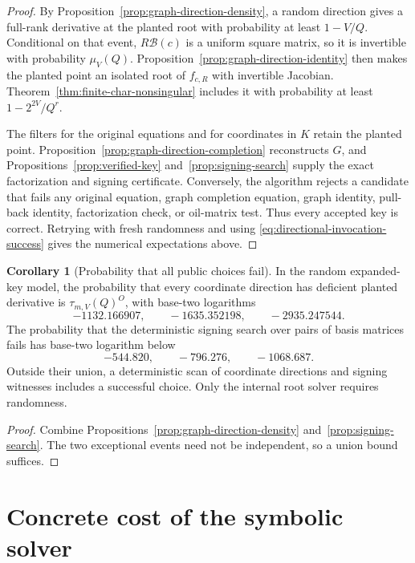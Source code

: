 \documentclass[11pt,a4paper]{article}
\theoremstyle{definition}
\newtheorem{corollary}[theorem]{Corollary}
\theoremstyle{remark}
\begin{document}
\begin{proof}
By Proposition~\ref{prop:graph-direction-density}, a random direction gives a
full-rank derivative at the planted root with probability at least $1-V/Q$.
Conditional on that event, $R\mathcal B(c)$ is a uniform square matrix, so it
is invertible with probability $\mu_V(Q)$.  Proposition~\ref{prop:graph-direction-identity}
then makes the planted point an isolated root of $f_{c,R}$ with invertible
Jacobian.  Theorem~\ref{thm:finite-char-nonsingular} includes it with
probability at least $1-2^{2V}/Q^r$.

The filters for the original equations and for coordinates in $K$ retain the
planted point.  Proposition~\ref{prop:graph-direction-completion} reconstructs
$G$, and Propositions~\ref{prop:verified-key} and~\ref{prop:signing-search}
supply the exact factorization and signing certificate.  Conversely, the
algorithm rejects a candidate that fails any original equation, graph
completion equation, graph identity, pull-back identity, factorization check,
or oil-matrix test.  Thus every accepted key is correct.  Retrying with fresh
randomness and using \eqref{eq:directional-invocation-success} gives the
numerical expectations above.
\end{proof}

\begin{corollary}[Probability that all public choices fail]\label{cor:directional-public-random}
In the random expanded-key model, the probability that every coordinate
direction has deficient planted derivative is
$\tau_{m,V}(Q)^O$, with base-two logarithms
\[
 -1132.166907,\qquad-1635.352198,\qquad-2935.247544.
\]
The probability that the deterministic signing search over pairs of basis
matrices fails has base-two logarithm below
\[
 -544.820,\qquad-796.276,\qquad-1068.687.
\]
Outside their union, a deterministic scan of coordinate directions and
signing witnesses includes a successful choice.  Only the internal root solver
requires randomness.
\end{corollary}

\begin{proof}
Combine Propositions~\ref{prop:graph-direction-density}
and~\ref{prop:signing-search}.  The two exceptional events need not be
independent, so a union bound suffices.
\end{proof}

\section{Concrete cost of the symbolic solver}\label{sec:concrete-solver}
\end{document}
